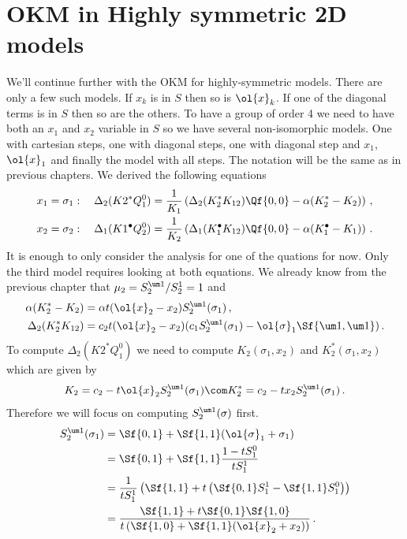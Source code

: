 
\chapter{OKM in Highly symmetric 2D models}
We'll continue further with the OKM for highly-symmetric models. There are only a few such models. If $x_k$ is in $S$ then so is $\ol{x}_k$. If one of the diagonal terms is in $S$ then so are the others. To have a group of order 4 we need to have both an $x_1$ and $x_2$ variable in $S$ so we have several non-isomorphic models. One with cartesian steps, one with diagonal steps, one with diagonal step and $x_1$,$\ol{x}_1$ and finally the model with all steps. The notation will be the same as in previous chapters. We derived the following equations
\begin{align}
	x_1 = \sigma_1:\quad\Delta_2(K2^\ast Q_1^0) &=\frac{1}{K_1} \left(\Delta_2(K_2^\ast K_{12})\Qf{0,0} - \alpha(K_2^\ast-K_2)\right)\,,\\
	x_2 = \sigma_2:\quad\Delta_1(K1^\bullet Q_2^0) &=\frac{1}{K_2} \left(\Delta_1(K_1^\bullet K_{12})\Qf{0,0} - \alpha(K_1^\bullet-K_1)\right)\,.
\end{align}
It is enough to only consider the analysis for one of the quations for now. Only the third model requires looking at both equations. We already know from the previous chapter that $\mu_2 = S_2^{\um 1}/S_2^1 = 1$ and 
\begin{align}
	\alpha(K_2^\ast -K_2)  &= \alpha t(\ol{x}_2 - x_2)S_2^{\um 1}(\sigma_1)\,,\\
	\Delta_2(K_2^\ast K_{12}) &= c_2t(\ol{x}_2-x_2)(c_1S_2^{\um 1}(\sigma_1) - \ol{\sigma}_1\Sf{\um 1,\um 1})\,.
\end{align}
To compute $\Delta_2(K2^\ast Q_1^0)$ we need to compute $K_2(\sigma_1,x_2)$ and $K_2^\ast(\sigma_1,x_2)$ which are given by
\begin{align}
	K_2 = c_2 -t\ol{x}_2S_2^{\um 1}(\sigma_1) \com K_2^\ast = c_2 -t x_2S_2^{\um 1}(\sigma_1)\,.
\end{align}
Therefore we will focus on computing $S_2^{\um 1}(\sigma)$ first.
\begin{align}
\begin{split}
	S_2^{\um 1}(\sigma_1) &= \Sf{0,1}+ \Sf{1,1}(\ol{\sigma}_1+\sigma_1)\\
	&= \Sf{0,1} + \Sf{1,1}\frac{1-tS_1^0}{t S_1^1}\\
	&= \frac{1}{tS_1^1}\left(\Sf{1,1}+t\left(\Sf{0,1}S_1^1-\Sf{1,1}S_1^0\right)\right)\\
	&= \frac{\Sf{1,1}+t\Sf{0,1}\Sf{1,0}}{t\left(\Sf{1,0}+\Sf{1,1}(\ol{x}_2+x_2)\right)}\,.
\end{split}
\end{align}
